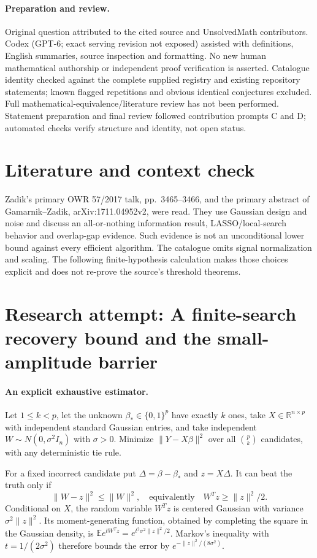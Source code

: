\documentclass[11pt]{article}
\begin{document}
\paragraph{Preparation and review.}
Original question attributed to the cited source and UnsolvedMath contributors. Codex (GPT-6; exact serving revision not exposed) assisted with definitions, English summaries, source inspection and formatting. No new human mathematical authorship or independent proof verification is asserted. Catalogue identity checked against the complete supplied registry and existing repository statements; known flagged repetitions and obvious identical conjectures excluded. Full mathematical-equivalence/literature review has not been performed. Statement preparation and final review followed contribution prompts C and D; automated checks verify structure and identity, not open status.
\label{end:statement}

\section{Literature and context check}
Zadik's primary OWR 57/2017 talk, pp.~3465--3466, and the primary abstract of Gamarnik--Zadik, arXiv:1711.04952v2, were read. They use Gaussian design and noise and discuss an all-or-nothing information result, LASSO/local-search behavior and overlap-gap evidence. Such evidence is not an unconditional lower bound against every efficient algorithm. The catalogue omits signal normalization and scaling. The following finite-hypothesis calculation makes those choices explicit and does not re-prove the source's threshold theorems.
\section{Research attempt: A finite-search recovery bound and the small-amplitude barrier}

\paragraph{An explicit exhaustive estimator.}
Let $1\le k<p$, let the unknown $\beta_*\in\{0,1\}^p$ have exactly $k$ ones, take $X\in\mathbb R^{n\times p}$ with independent standard Gaussian entries, and take independent $W\sim N(0,\sigma^2I_n)$ with $\sigma>0$. Minimize $\|Y-X\beta\|^2$ over all $\binom pk$ candidates, with any deterministic tie rule.

For a fixed incorrect candidate put $\Delta=\beta-\beta_*$ and $z=X\Delta$. It can beat the truth only if
\[
 \|W-z\|^2\le\|W\|^2,
 \quad\text{equivalently}\quad
 W^Tz\ge\|z\|^2/2.
\]
Conditional on $X$, the random variable $W^Tz$ is centered Gaussian with variance $\sigma^2\|z\|^2$. Its moment-generating function, obtained by completing the square in the Gaussian density, is $\mathbb Ee^{tW^Tz}=e^{t^2\sigma^2\|z\|^2/2}$. Markov's inequality with $t=1/(2\sigma^2)$ therefore bounds the error by $e^{-\|z\|^2/(8\sigma^2)}$.
\end{document}
